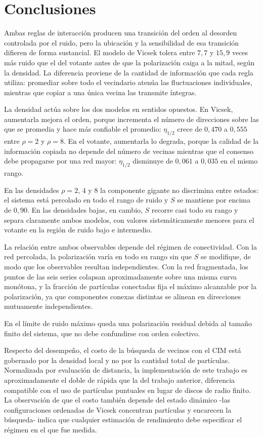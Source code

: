 \documentclass[11pt,a4paper]{article}
\begin{document}
\section{Conclusiones}

Ambas reglas de interacción producen una transición del orden al desorden
controlada por el ruido, pero la ubicación y la sensibilidad de esa transición
difieren de forma sustancial. El modelo de Vicsek tolera entre $7{,}7$ y $15{,}9$
veces más ruido que el del votante antes de que la polarización caiga a la mitad,
según la densidad. La diferencia proviene de la cantidad de información que cada
regla utiliza: promediar sobre todo el vecindario atenúa las fluctuaciones
individuales, mientras que copiar a una única vecina las transmite íntegras.

La densidad actúa sobre los dos modelos en sentidos opuestos. En Vicsek,
aumentarla mejora el orden, porque incrementa el número de direcciones sobre las
que se promedia y hace más confiable el promedio: $\eta_{1/2}$ crece de $0{,}470$
a $0{,}555$ entre $\rho = 2$ y $\rho = 8$. En el votante, aumentarla lo degrada,
porque la calidad de la información copiada no depende del número de vecinas
mientras que el consenso debe propagarse por una red mayor: $\eta_{1/2}$
disminuye de $0{,}061$ a $0{,}035$ en el mismo rango.

En las densidades $\rho = 2$, $4$ y $8$ la componente gigante no discrimina entre
estados: el sistema está percolado en todo el rango de ruido y $S$ se mantiene por
encima de $0{,}90$. En las densidades bajas, en cambio, $S$ recorre casi todo su
rango y separa claramente ambos modelos, con valores sistemáticamente menores
para el votante en la región de ruido bajo e intermedio.

La relación entre ambos observables depende del régimen de conectividad. Con la
red percolada, la polarización varía en todo su rango sin que $S$ se modifique, de
modo que los observables resultan independientes. Con la red fragmentada, los
puntos de las seis series colapsan aproximadamente sobre una misma curva
monótona, y la fracción de partículas conectadas fija el máximo alcanzable por la
polarización, ya que componentes conexas distintas se alinean en direcciones
mutuamente independientes.

En el límite de ruido máximo queda una polarización residual debida al tamaño
finito del sistema, que no debe confundirse con orden colectivo.

Respecto del desempeño, el costo de la búsqueda de vecinos con el CIM está
gobernado por la densidad local y no por la cantidad total de partículas.
Normalizada por evaluación de distancia, la implementación de este trabajo es
aproximadamente el doble de rápida que la del trabajo anterior, diferencia
compatible con el uso de partículas puntuales en lugar de discos de radio finito.
La observación de que el costo también depende del estado dinámico -las
configuraciones ordenadas de Vicsek concentran partículas y encarecen la
búsqueda- indica que cualquier estimación de rendimiento debe especificar el
régimen en el que fue medida.
\end{document}
